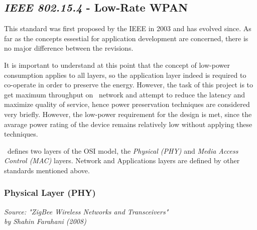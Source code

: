 \subsection{\emph{IEEE 802.15.4} - Low-Rate WPAN}

  This standard was first proposed by the IEEE in 2003 and has
 evolved since. As far as the concepts essestial for application
 development are concerned, there is no major difference between
 the revisions.

 It is important to understand at this point that the concept of
 low-power consumption applies to all layers, so the application
 layer indeed is required to co-operate in order to preserve the
 energy. However, the task of this project is to get maximum
 throughput on \WPAN\ network and attempt to reduce the latency
 and maximize quality of service, hence power preservation
 techniques are considered very briefly. However, the low-power
 requirement for the design is met, since the avarage power rating
 of the device remains relatively low without applying these
 techniques.
 

 \WPAN\ defines two layers of the OSI model, the \emph{Physical (PHY)}
 and \emph{Media Access Control (MAC)} layers. Network and Applications
 layers are defined by other standards mentioned above.


\subsubsection{Physical Layer (PHY)}

\begin{flushright} \small{
\emph{Source: "ZigBee Wireless Networks and Transceivers" \\
	by Shahin Farahani (2008) \cite{b:zigbee}}}
	\end{flushright}



